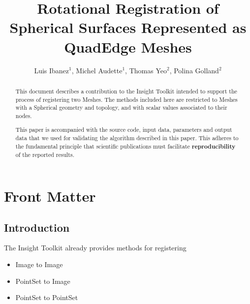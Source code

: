 \documentclass{InsightArticle}
\title{Rotational Registration of Spherical Surfaces Represented as QuadEdge Meshes}
\author{Luis Ibanez$^{1}$, Michel Audette$^{1}$, Thomas Yeo$^{2}$, Polina Golland$^{2}$}
\newcommand{\IJhandlerIDnumber}{3063}
\begin{document}
%
% 
\IJhandlefooter{\IJhandlerIDnumber}


\ifpdf
\else
\fi


\maketitle


\ifhtml
\chapter*{Front Matter\label{front}}
\fi


\begin{abstract}
\noindent
This document describes a contribution to the Insight Toolkit intended to
support the process of registering two Meshes.  The methods included here are
restricted to Meshes with a Spherical geometry and topology, and with scalar
values associated to their nodes.

This paper is accompanied with the source code, input data, parameters and
output data that we used for validating the algorithm described in this paper.
This adheres to the fundamental principle that scientific publications must
facilitate \textbf{reproducibility} of the reported results.
\end{abstract}

\tableofcontents

\section{Introduction}

The Insight Toolkit already provides methods for registering

\begin{itemize}
\item Image to Image
\item PointSet to Image
\item PointSet to PointSet
\end{itemize}
\end{document}
